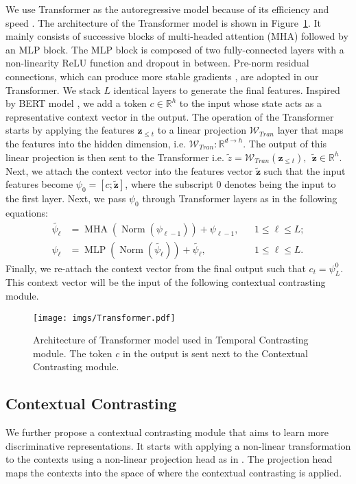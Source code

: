 \documentclass{article}
\begin{document}
We use Transformer as the autoregressive model because of its efficiency and speed \cite{NIPS2017_3f5ee243}. The architecture of the Transformer model is shown in Figure~\ref{Fig:transformer}. It mainly consists of successive blocks of multi-headed attention (MHA) followed by an MLP block. The MLP block is composed of two fully-connected layers with a non-linearity ReLU function and dropout in between. Pre-norm residual connections, which can produce more stable gradients \cite{wang_learning}, are adopted in our Transformer. We stack $L$ identical layers to generate the final features. Inspired by BERT model \cite{devlin2018bert}, we add a token $c \in \mathbb{R}^{h}$ to the input whose state acts as a representative context vector in the output. 
The operation of the Transformer starts by applying the features $\mathbf{z}_{\leq t}$ to a linear projection $\mathcal{W}_{Tran}$ layer that maps the features into the hidden dimension, i.e. $\mathcal{W}_{Tran} : \mathbb{R}^{d \rightarrow h}$. The output of this linear projection is then sent to the Transformer i.e. $\tilde{z} = \mathcal{W}_{Tran} (\mathbf{z}_{\leq t}),~~\tilde{\mathbf{z}} \in \mathbb{R}^{h}$.
Next, we attach the context vector into the features vector $\tilde{\mathbf{z}}$ such that the input features become $\psi_0 = [c; \tilde{\mathbf{z}}]$, where the subscript 0 denotes being the input to the first layer.
Next, we pass $\psi_0$ through Transformer layers as in the following equations:
\begin{align}
    \tilde{\psi_\ell} &= \operatorname{MHA}(\operatorname{Norm}(\psi_{\ell-1})) + \psi_{\ell-1}, && 1 \leq \ell \leq L; \label{eq:msa_apply} \\
    \psi_\ell &= \operatorname{MLP}(\operatorname{Norm}(\tilde{\psi_\ell})) + \tilde{\psi_\ell}, && 1 \leq \ell \leq L.  \label{eq:mlp_apply}
\end{align}
Finally, we re-attach the context vector from the final output such that $c_t = \psi_L^0$.
This context vector will be the input of the following contextual contrasting module.

\begin{figure}
\centering
\texttt{[image: imgs/Transformer.pdf]}
\caption{Architecture of Transformer model used in Temporal Contrasting module. The token $c$ in the output is sent next to the Contextual Contrasting module.}
\label{Fig:transformer}
\end{figure}



\subsection{Contextual Contrasting}
We further propose a contextual contrasting module that aims to learn more discriminative representations. It starts with applying a non-linear transformation to the contexts using a non-linear projection head as in \cite{chen2020simple}. The projection head maps the contexts into the space of where the contextual contrasting is applied. 
\end{document}

